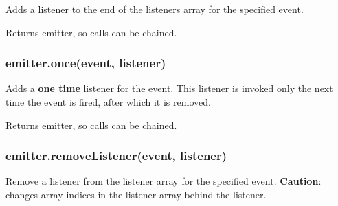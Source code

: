 Adds a listener to the end of the listeners array for the specified
event.

\begin{Shaded}
\begin{Highlighting}[]
\NormalTok{(}\NormalTok{, } 
  \NormalTok{(}\NormalTok{);}
\NormalTok{\});}
\end{Highlighting}
\end{Shaded}

Returns emitter, so calls can be chained.

\subsubsection{emitter.once(event, listener)}

Adds a \textbf{one time} listener for the event. This listener is
invoked only the next time the event is fired, after which it is
removed.

\begin{Shaded}
\begin{Highlighting}[]
\NormalTok{(}\NormalTok{, } 
  \NormalTok{(}\NormalTok{);}
\NormalTok{\});}
\end{Highlighting}
\end{Shaded}

Returns emitter, so calls can be chained.

\subsubsection{emitter.removeListener(event, listener)}

Remove a listener from the listener array for the specified event.
\textbf{Caution}: changes array indices in the listener array behind the
listener.

\begin{Shaded}
\begin{Highlighting}[]
 
  \NormalTok{(}\NormalTok{);}
\NormalTok{\};}
\NormalTok{(}
\NormalTok{(}
\end{Highlighting}
\end{Shaded}

